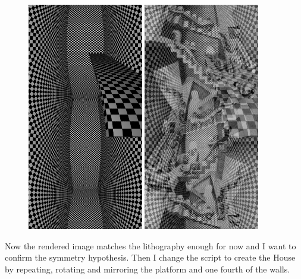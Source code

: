 \documentclass[12pt, a4paper]{article}
\begin{document}
\begin{center}
\begin{figure}[H]
\centering
\includegraphics[height=10cm]{./XL-51_5.png}
\includegraphics[height=10cm]{./checkDimensionViewPoint_3.png}\\
\end{figure}
\end{center}

Now the rendered image matches the lithography enough for now and I want to confirm the symmetry hypothesis. Then I change the script to create the House by repeating, rotating and mirroring the platform and one fourth of the walls.\\

\begin{scriptsize}
\begin{ttfamily}

\end{ttfamily}
\end{scriptsize}
\end{document}
